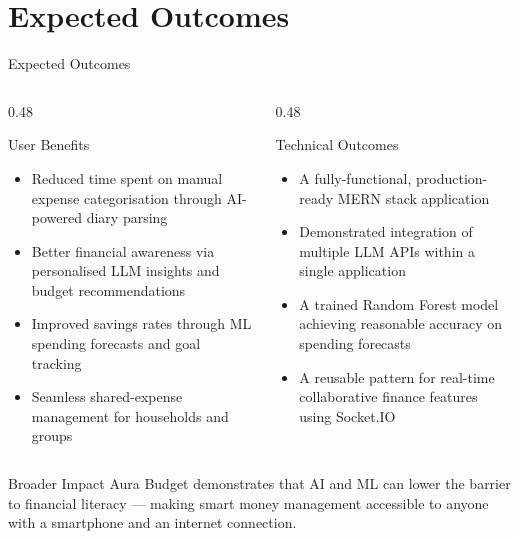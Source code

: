 \documentclass[aspectratio=169, 11pt]{beamer}
\newcommand{\bulletitem}[1]{\item[\textcolor{auraviolet}{\faCheckCircle}] #1}
\begin{document}
\section{Expected Outcomes}
\begin{frame}{Expected Outcomes}
  \begin{columns}[T]
    \begin{column}{0.48\textwidth}
      \begin{block}{User Benefits}
        \begin{itemize}
          \bulletitem{Reduced time spent on manual expense categorisation through AI-powered diary parsing}
          \bulletitem{Better financial awareness via personalised LLM insights and budget recommendations}
          \bulletitem{Improved savings rates through ML spending forecasts and goal tracking}
          \bulletitem{Seamless shared-expense management for households and groups}
        \end{itemize}
      \end{block}
    \end{column}
    \begin{column}{0.48\textwidth}
      \begin{block}{Technical Outcomes}
        \begin{itemize}
          \bulletitem{A fully-functional, production-ready MERN stack application}
          \bulletitem{Demonstrated integration of multiple LLM APIs within a single application}
          \bulletitem{A trained Random Forest model achieving reasonable accuracy on spending forecasts}
          \bulletitem{A reusable pattern for real-time collaborative finance features using Socket.IO}
        \end{itemize}
      \end{block}
    \end{column}
  \end{columns}

  \vspace{10pt}
  \begin{alertblock}{Broader Impact}
    Aura Budget demonstrates that AI and ML can lower the barrier to financial
    literacy — making smart money management accessible to anyone with a
    smartphone and an internet connection.
  \end{alertblock}
\end{frame}
\end{document}
